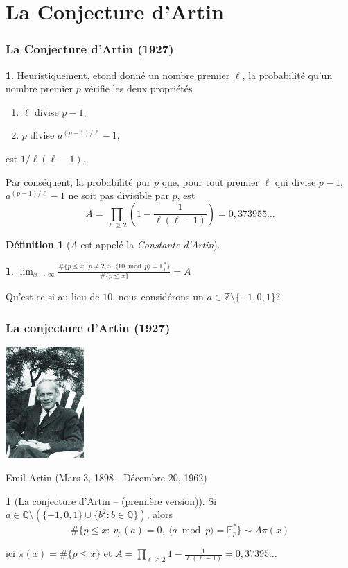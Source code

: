 \documentclass[10pt,handout]{beamer} %
\newcommand{\Q}{\mathbb Q}
\newcommand{\Z}{\mathbb Z}
\newcommand{\F}{\mathbb F}
\theoremstyle{definition}
\newtheorem{defi}[theorem]{D\'efinition}
\newtheorem{conj}[theorem]{\translate{Conjecture}}
\newtheorem{Note}[theorem]{\translate{Remarque}}
\begin{document}
\section{La Conjecture d'Artin}
\begin{frame}
\frametitle{La Conjecture d'Artin (1927)}
\begin{Note} Heuristiquement, etond donn\'e un nombre premier $\ell$, la probabilit\'e qu'un nombre premier $p$ v\'erifie les deux propri\'et\'es 
\begin{enumerate}
\item $\ell$ divise $p-1$,
\item $p$ divise $a^{(p-1)/\ell}-1$,
\end{enumerate}
 est $1/\ell(\ell-1)$.\pause

Par cons\'equent, la probabilit\'e pur $p$
que, pour tout premier $\ell$ qui divise $p-1$,  $a^{(p-1)/\ell}-1$ ne soit pas divisible par $p$, est
$$A=\prod_{\ell\ge2}\left(1-\frac1{\ell(\ell-1)}\right)=0,373955\ldots$$
\end{Note}\pause

\begin{defi} [$A$ est appel\'e la \emph{Constante d'Artin}]%
\end{defi}\pause

\begin{conj}%
\centerline{$\lim_{x\rightarrow\infty}\frac{\#\{p\le x:\ p\ne2,5,\ \langle 10\bmod p\rangle=\F_p^*\}}{\#\{p\le x\}}= A$}
\end{conj}\pause

Qu'est-ce si au lieu de $10$, nous consid\'erons un $a\in\Z\setminus\{-1,0,1\}$?
\end{frame}

\begin{frame}
\frametitle{La conjecture d'Artin (1927)}

\centerline{\includegraphics[width=3cm]{images/EmilArtin.jpg}}

\centerline{Emil Artin (Mars 3, 1898 - D\'ecembre 20, 1962)}
\pause


\begin{conj}[La conjecture d'Artin -- (premi\`ere version)] Si $a\in\Q\setminus\left(\{-1,0,1\}\cup\{b^2: b\in\Q\}\right)$, alors
$$\#\{p\le x:\ v_p(a)=0,\ \langle a\bmod p\rangle=\F_p^*\}\sim A\pi(x)$$
\end{conj}\pause

ici $\pi(x)=\#\{p\le x\}$ et $A=\displaystyle{\prod_{\ell\ge2}}1-\frac1{\ell(\ell-1)}=0,37395\ldots$
\end{frame}
\end{document}
